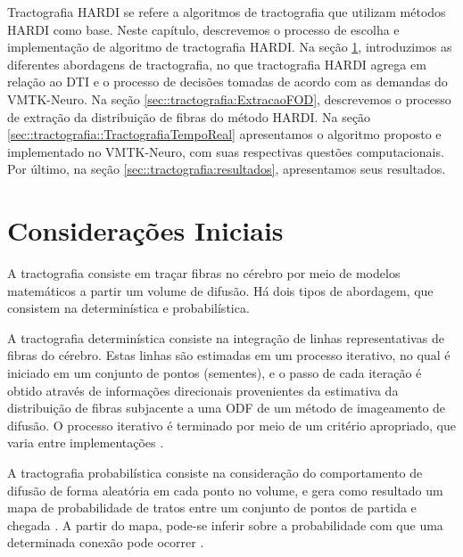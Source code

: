 \documentclass[
    12pt,                %
    oneside,            %
    a4paper,            %
    english,            %
    french,                %
    spanish,            %
    brazil                %
    ]{abntex2}
\begin{document}
Tractografia HARDI se refere a algoritmos de tractografia que utilizam métodos HARDI como base. Neste capítulo, descrevemos o processo de escolha e implementação de algoritmo de tractografia HARDI. Na seção \ref{sec::tractografia:consideracoes_iniciais}, introduzimos as diferentes abordagens de tractografia, no que tractografia HARDI agrega em relação ao DTI e o processo de decisões tomadas de acordo com as demandas do VMTK-Neuro. Na seção \ref{sec::tractografia:ExtracaoFOD}, descrevemos o processo de extração da distribuição de fibras do método HARDI. Na seção \ref{sec::tractografia::TractografiaTempoReal} apresentamos o algoritmo proposto e implementado no VMTK-Neuro, com suas respectivas questões computacionais. Por último, na seção \ref{sec::tractografia:resultados}, apresentamos seus resultados.



\section{Considerações Iniciais}
\label{sec::tractografia:consideracoes_iniciais}

A tractografia consiste em traçar fibras no cérebro por meio de modelos matemáticos a partir um volume de difusão. Há dois tipos de abordagem, que consistem na determinística e probabilística.

A tractografia determinística consiste na integração de linhas representativas de fibras do cérebro. Estas linhas são estimadas em um processo iterativo, no qual é iniciado em um conjunto de pontos (sementes), e o passo de cada iteração é obtido através de informações direcionais provenientes da estimativa da distribuição de fibras subjacente a uma ODF de um método de imageamento de difusão. O processo iterativo é terminado por meio de um critério apropriado, que varia entre implementações \cite{tournier2011}.



A tractografia probabilística consiste na consideração do comportamento de difusão de forma aleatória em cada ponto no volume, e gera como resultado um mapa de probabilidade de tratos entre um conjunto de pontos de partida e chegada \cite{DTI_Handbook}. A partir do mapa, pode-se inferir sobre a probabilidade com que uma determinada conexão pode ocorrer \cite{tournier2011}. %
\end{document}
